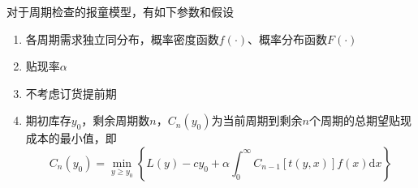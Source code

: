 \documentclass{../notes}
\begin{document}
    对于周期检查的报童模型，有如下参数和假设

    \begin{enumerate}
        \item 各周期需求独立同分布，概率密度函数$f(\cdot)$、概率分布函数$F(\cdot)$
        \item 贴现率$\alpha$
        \item 不考虑订货提前期
        \item 期初库存$y_0$，剩余周期数$n$，$C_n(y_0)$为当前周期到剩余$n$个周期的总期望贴现成本的最小值，即
        \begin{equation*}
            C_n\left(y_0\right) = \min_{y\geq y_0}\left\{L(y) - cy_0 + \alpha\int_0^\infty C_{n-1}[t(y, x)]f(x)\mathrm dx\right\}
        \end{equation*}
    \end{enumerate}
\end{document}
